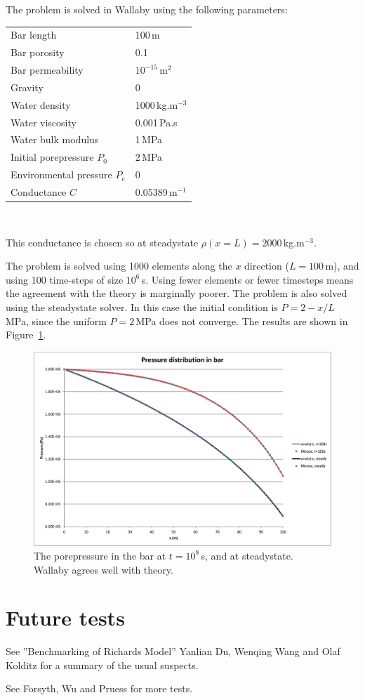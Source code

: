 \documentclass[]{scrreprt}
\begin{document}
\noindent The problem is solved in Wallaby using the following parameters:
\begin{center}
\begin{tabular}{|ll|}
\hline
Bar length & 100\,m \\
Bar porosity & 0.1 \\
Bar permeability & $10^{-15}$\,m$^{2}$ \\
\hline
Gravity & 0 \\
\hline
Water density & 1000\,kg.m$^{-3}$ \\
Water viscosity & 0.001\,Pa.s \\
Water bulk modulus & 1\,MPa \\
\hline
Initial porepressure $P_{0}$ & 2\,MPa \\
Environmental pressure $P_{e}$ & 0 \\
\hline
Conductance $C$ & 0.05389\,m$^{-1}$ \\
\hline
\end{tabular} \\
\end{center}
This conductance is chosen so at steadystate $\rho(x=L)=2000$\,kg.m$^{-3}$.

The problem is solved using 1000 elements along the $x$
direction ($L=100$\,m), and using 100 time-steps of size $10^6$\,s.
Using fewer elements or fewer timesteps means the agreement with the
theory is marginally poorer.  The problem is also solved using the
steadystate solver.  In this case the initial condition is
$P=2-x/L$\,MPa, since the uniform $P=2$\,MPa does not converge.  The
results are shown in Figure~\ref{nc.fig}.

\begin{figure}[htb]
\begin{center}
\includegraphics[width=17cm]{nc.eps}
\caption{The porepressure in the bar at $t=10^{8}$\,s, and at
  steadystate.  Wallaby agrees well with theory.}
\label{nc.fig}
\end{center}
\end{figure}







\chapter{Future tests}

See ''Benchmarking of Richards Model'' Yanlian Du, Wenqing Wang and
Olaf Kolditz for a summary of the usual suspects.

See Forsyth, Wu and Pruess for more tests.
\end{document}
